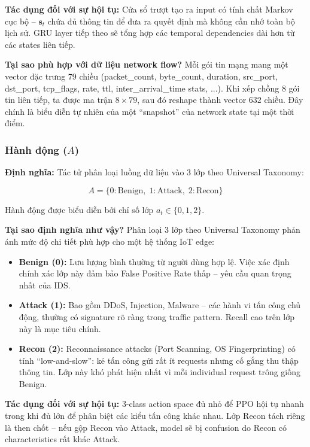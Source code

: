 \documentclass[12pt,a4paper]{article}
\begin{document}
\textbf{Tác dụng đối với sự hội tụ:} Cửa sổ trượt tạo ra input có tính chất Markov cục bộ -- $\mathbf{s}_t$ chứa đủ thông tin để đưa ra quyết định mà không cần nhớ toàn bộ lịch sử. GRU layer tiếp theo sẽ tổng hợp các temporal dependencies dài hơn từ các states liên tiếp.

\textbf{Tại sao phù hợp với dữ liệu network flow?} Mỗi gói tin mạng mang một vector đặc trưng 79 chiều (packet\_count, byte\_count, duration, src\_port, dst\_port, tcp\_flags, rate, ttl, inter\_arrival\_time stats, ...). Khi xếp chồng 8 gói tin liên tiếp, ta được ma trận $8 \times 79$, sau đó reshape thành vector $632$ chiều. Đây chính là biểu diễn tự nhiên của một ``snapshot'' của network state tại một thời điểm.

\subsubsection{Hành động ($A$)}

\textbf{Định nghĩa:} Tác tử phân loại luồng dữ liệu vào 3 lớp theo Universal Taxonomy:

\begin{equation}
    A = \{0: \text{Benign},\; 1: \text{Attack},\; 2: \text{Recon}\}
\end{equation}

Hành động được biểu diễn bởi chỉ số lớp $a_t \in \{0, 1, 2\}$.

\textbf{Tại sao định nghĩa như vậy?} Phân loại 3 lớp theo Universal Taxonomy phản ánh mức độ chi tiết phù hợp cho một hệ thống IoT edge:
\begin{itemize}
    \item \textbf{Benign (0):} Lưu lượng bình thường từ người dùng hợp lệ. Việc xác định chính xác lớp này đảm bảo False Positive Rate thấp -- yêu cầu quan trọng nhất của IDS.
    \item \textbf{Attack (1):} Bao gồm DDoS, Injection, Malware -- các hành vi tấn công chủ động, thường có signature rõ ràng trong traffic pattern. Recall cao trên lớp này là mục tiêu chính.
    \item \textbf{Recon (2):} Reconnaissance attacks (Port Scanning, OS Fingerprinting) có tính ``low-and-slow'': kẻ tấn công gửi rất ít requests nhưng cố gắng thu thập thông tin. Lớp này khó phát hiện nhất vì mỗi individual request trông giống Benign.
\end{itemize}

\textbf{Tác dụng đối với sự hội tụ:} 3-class action space đủ nhỏ để PPO hội tụ nhanh trong khi đủ lớn để phân biệt các kiểu tấn công khác nhau. Lớp Recon tách riêng là then chốt -- nếu gộp Recon vào Attack, model sẽ bị confusion do Recon có characteristics rất khác Attack.
\end{document}
